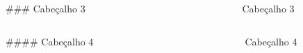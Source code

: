 \documentclass[
]{book}
\begin{document}
\begin{columns}

\begin{column}

\#\#\# Cabeçalho 3

\end{column}

\begin{column}

~

\end{column}

\begin{column}

\hypertarget{cabeuxe7alho-3}{}
\begin{section}

Cabeçalho 3

\end{section}

\end{column}

\end{columns}

\begin{columns}

\begin{column}

\#\#\#\# Cabeçalho 4

\end{column}

\begin{column}

~

\end{column}

\begin{column}

\hypertarget{cabeuxe7alho-4}{}
\begin{section}

Cabeçalho 4

\end{section}

\end{column}

\end{columns}
\end{document}
